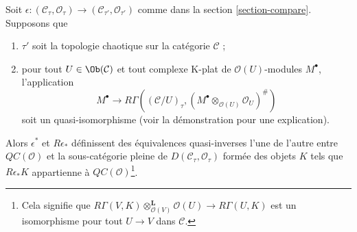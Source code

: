 \begin{lemma}
\label{lemma-cartesion-plus-topology}
Soit $\epsilon : (\mathcal{C}_\tau, \mathcal{O}_\tau) \to
(\mathcal{C}_{\tau'}, \mathcal{O}_{\tau'})$ comme dans la section
\ref{section-compare}. Supposons que
\begin{enumerate}
\item $\tau'$ soit la topologie chaotique sur la catégorie $\mathcal{C}$ ;
\item pour tout $U \in \Ob(\mathcal{C})$ et tout complexe K-plat de
$\mathcal{O}(U)$-modules $M^\bullet$, l'application
$$
M^\bullet \longrightarrow
R\Gamma((\mathcal{C}/U)_\tau,
(M^\bullet \otimes_{\mathcal{O}(U)} \mathcal{O}_U)^\#)
$$
soit un quasi-isomorphisme (voir la démonstration pour une explication).
\end{enumerate}
Alors $\epsilon^*$ et $R\epsilon_*$ définissent des équivalences quasi-inverses
l'une de l'autre entre $\mathit{QC}(\mathcal{O})$ et la sous-catégorie pleine
de $D(\mathcal{C}_\tau, \mathcal{O}_\tau)$ formée des objets $K$ tels que
$R\epsilon_*K$ appartienne à $\mathit{QC}(\mathcal{O})$\footnote{Cela signifie
que
$R\Gamma(V, K) \otimes_{\mathcal{O}(V)}^\mathbf{L} \mathcal{O}(U)
\to R\Gamma(U, K)$ est un isomorphisme pour tout $U \to V$ dans
$\mathcal{C}$.}.
\end{lemma}

